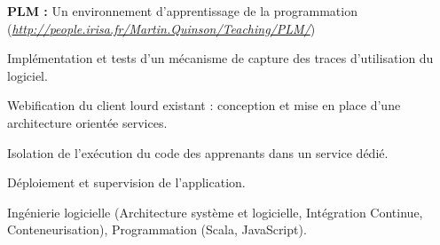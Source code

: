 \begin{cventries}
\begin{cvparagraph}
    \textbf{PLM :} Un environnement d'apprentissage de la programmation (\href{http://people.irisa.fr/Martin.Quinson/Teaching/PLM/}{\emph{http://people.irisa.fr/Martin.Quinson/Teaching/PLM/}})

    \medskip
    \begin{cvitems} %
        \item Implémentation et tests d'un mécanisme de capture des traces d'utilisation du logiciel.
        \item Webification du client lourd existant : conception et mise en place d'une architecture orientée services.
        \item Isolation de l'exécution du code des apprenants dans un service dédié.
        \item Déploiement et supervision de l'application.
    \end{cvitems}

    \medskip
     Ingénierie logicielle (Architecture système et logicielle, Intégration Continue, Conteneurisation), Programmation (Scala, JavaScript).
\end{cvparagraph}

\end{cventries}
